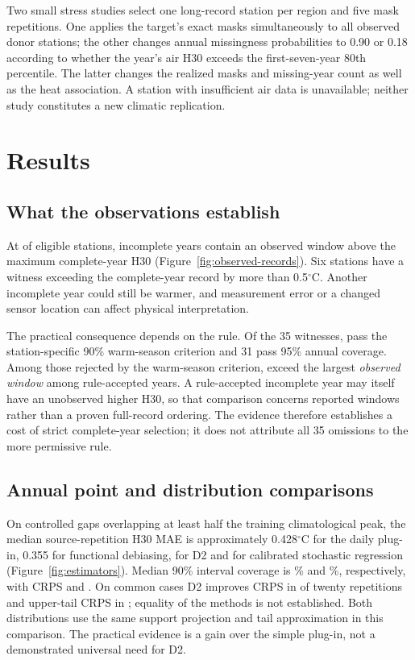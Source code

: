 \documentclass[draft,linenumbers]{agujournal2025}
\begin{document}


Two small stress studies select one long-record station per region and five mask repetitions. One applies the target's exact masks simultaneously to all observed donor stations; the other changes annual missingness probabilities to 0.90 or 0.18 according to whether the year's air H30 exceeds the first-seven-year 80th percentile. The latter changes the realized masks and missing-year count as well as the heat association. A station with insufficient air data is unavailable; neither study constitutes a new climatic replication.

\section{Results}
\subsection{What the observations establish}

At \RRecordStations{} of \RRecordDenominator{} eligible stations, \RRecordStationYears{} incomplete years contain an observed window above the maximum complete-year H30 (Figure~\ref{fig:observed-records}). Six stations have a witness exceeding the complete-year record by more than 0.5$^{\circ}$C. Another incomplete year could still be warmer, and measurement error or a changed sensor location can affect physical interpretation.

The practical consequence depends on the rule. Of the 35 witnesses, \WAWarmAdmitted{} pass the station-specific 90\% warm-season criterion and 31 pass 95\% annual coverage. Among those rejected by the warm-season criterion, \WAWarmExcludedExceed{} exceed the largest \emph{observed window} among rule-accepted years. A rule-accepted incomplete year may itself have an unobserved higher H30, so that comparison concerns reported windows rather than a proven full-record ordering. The evidence therefore establishes a cost of strict complete-year selection; it does not attribute all 35 omissions to the more permissive rule.



\subsection{Annual point and distribution comparisons}
On controlled gaps overlapping at least half the training climatological peak, the median source-repetition H30 MAE is approximately 0.428$^{\circ}$C for the daily plug-in, 0.355 for functional debiasing, \WADTwoMAE{} for D2 and \WAStochasticMAE{} for calibrated stochastic regression (Figure~\ref{fig:estimators}). Median 90\% interval coverage is \WADTwoCoverage\% and \WAStochasticCoverage\%, respectively, with CRPS \WADTwoCRPS{} and \WAStochasticCRPS{}. On common cases D2 improves CRPS in \WADTwoCRPSWins{} of twenty repetitions and upper-tail CRPS in \WADTwoTailWins{}; equality of the methods is not established. Both distributions use the same support projection and tail approximation in this comparison. The practical evidence is a gain over the simple plug-in, not a demonstrated universal need for D2.
\end{document}
